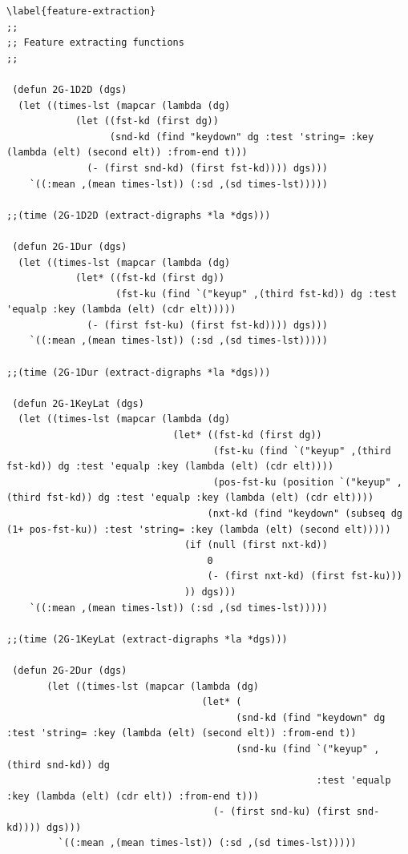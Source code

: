 \begin{lstlisting}[frame=single]
\label{feature-extraction}
;;
;; Feature extracting functions
;;

 (defun 2G-1D2D (dgs)
  (let ((times-lst (mapcar (lambda (dg)
            (let ((fst-kd (first dg))
                  (snd-kd (find "keydown" dg :test 'string= :key (lambda (elt) (second elt)) :from-end t)))
              (- (first snd-kd) (first fst-kd)))) dgs)))
    `((:mean ,(mean times-lst)) (:sd ,(sd times-lst)))))

;;(time (2G-1D2D (extract-digraphs *la *dgs)))

 (defun 2G-1Dur (dgs)
  (let ((times-lst (mapcar (lambda (dg)
            (let* ((fst-kd (first dg))
                   (fst-ku (find `("keyup" ,(third fst-kd)) dg :test 'equalp :key (lambda (elt) (cdr elt)))))
              (- (first fst-ku) (first fst-kd)))) dgs)))
    `((:mean ,(mean times-lst)) (:sd ,(sd times-lst)))))

;;(time (2G-1Dur (extract-digraphs *la *dgs)))

 (defun 2G-1KeyLat (dgs)
  (let ((times-lst (mapcar (lambda (dg)
                             (let* ((fst-kd (first dg))
                                    (fst-ku (find `("keyup" ,(third fst-kd)) dg :test 'equalp :key (lambda (elt) (cdr elt))))
                                    (pos-fst-ku (position `("keyup" ,(third fst-kd)) dg :test 'equalp :key (lambda (elt) (cdr elt))))
                                   (nxt-kd (find "keydown" (subseq dg (1+ pos-fst-ku)) :test 'string= :key (lambda (elt) (second elt)))))
                               (if (null (first nxt-kd))
                                   0
                                   (- (first nxt-kd) (first fst-ku)))
                               )) dgs)))
    `((:mean ,(mean times-lst)) (:sd ,(sd times-lst)))))

;;(time (2G-1KeyLat (extract-digraphs *la *dgs)))

 (defun 2G-2Dur (dgs)
       (let ((times-lst (mapcar (lambda (dg)
                                  (let* (
                                        (snd-kd (find "keydown" dg :test 'string= :key (lambda (elt) (second elt)) :from-end t))
                                        (snd-ku (find `("keyup" ,(third snd-kd)) dg
                                                      :test 'equalp :key (lambda (elt) (cdr elt)) :from-end t)))
                                    (- (first snd-ku) (first snd-kd)))) dgs)))
         `((:mean ,(mean times-lst)) (:sd ,(sd times-lst)))))


\end{lstlisting}
